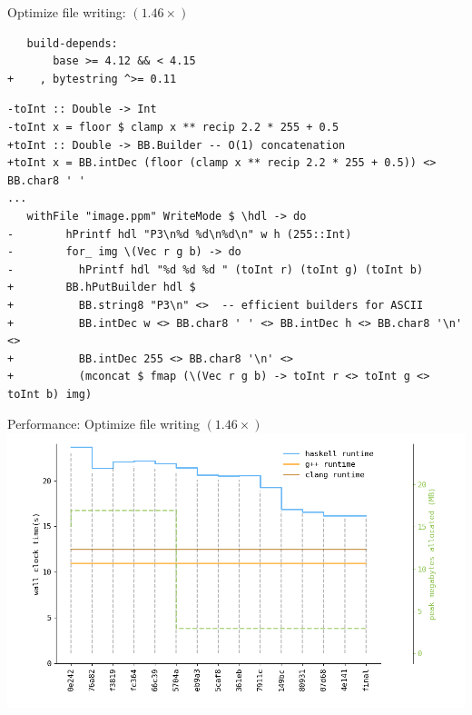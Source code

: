\documentclass[8pt]{beamer}
\begin{document}
\begin{frame}[fragile]{Optimize file writing: $(1.46\times)$}
\begin{verbatim}
   build-depends:
       base >= 4.12 && < 4.15
+    , bytestring ^>= 0.11
\end{verbatim}
\begin{verbatim}
-toInt :: Double -> Int
-toInt x = floor $ clamp x ** recip 2.2 * 255 + 0.5
+toInt :: Double -> BB.Builder -- O(1) concatenation
+toInt x = BB.intDec (floor (clamp x ** recip 2.2 * 255 + 0.5)) <> BB.char8 ' '
... 
   withFile "image.ppm" WriteMode $ \hdl -> do
-        hPrintf hdl "P3\n%d %d\n%d\n" w h (255::Int)
-        for_ img \(Vec r g b) -> do
-          hPrintf hdl "%d %d %d " (toInt r) (toInt g) (toInt b)
+        BB.hPutBuilder hdl $
+          BB.string8 "P3\n" <>  -- efficient builders for ASCII
+          BB.intDec w <> BB.char8 ' ' <> BB.intDec h <> BB.char8 '\n' <>
+          BB.intDec 255 <> BB.char8 '\n' <>
+          (mconcat $ fmap (\(Vec r g b) -> toInt r <> toInt g <> toInt b) img)
\end{verbatim}


\end{frame}


\begin{frame}[fragile]{Performance: Optimize file writing $(1.46\times)$}
\includegraphics[height=0.6\textwidth]{perfdata-upto-4e141-gen.png}
\end{frame}
\end{document}
